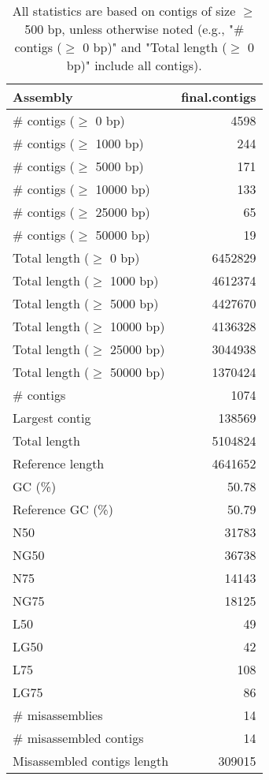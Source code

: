 \documentclass[12pt,a4paper]{article}
\begin{document}
\begin{table}[ht]
\begin{center}
\caption{All statistics are based on contigs of size $\geq$ 500 bp, unless otherwise noted (e.g., "\# contigs ($\geq$ 0 bp)" and "Total length ($\geq$ 0 bp)" include all contigs).}
\begin{tabular}{|l*{1}{|r}|}
\hline
Assembly & final.contigs \\ \hline
\# contigs ($\geq$ 0 bp) & 4598 \\ \hline
\# contigs ($\geq$ 1000 bp) & 244 \\ \hline
\# contigs ($\geq$ 5000 bp) & 171 \\ \hline
\# contigs ($\geq$ 10000 bp) & 133 \\ \hline
\# contigs ($\geq$ 25000 bp) & 65 \\ \hline
\# contigs ($\geq$ 50000 bp) & 19 \\ \hline
Total length ($\geq$ 0 bp) & 6452829 \\ \hline
Total length ($\geq$ 1000 bp) & 4612374 \\ \hline
Total length ($\geq$ 5000 bp) & 4427670 \\ \hline
Total length ($\geq$ 10000 bp) & 4136328 \\ \hline
Total length ($\geq$ 25000 bp) & 3044938 \\ \hline
Total length ($\geq$ 50000 bp) & 1370424 \\ \hline
\# contigs & 1074 \\ \hline
Largest contig & 138569 \\ \hline
Total length & 5104824 \\ \hline
Reference length & 4641652 \\ \hline
GC (\%) & 50.78 \\ \hline
Reference GC (\%) & 50.79 \\ \hline
N50 & 31783 \\ \hline
NG50 & 36738 \\ \hline
N75 & 14143 \\ \hline
NG75 & 18125 \\ \hline
L50 & 49 \\ \hline
LG50 & 42 \\ \hline
L75 & 108 \\ \hline
LG75 & 86 \\ \hline
\# misassemblies & 14 \\ \hline
\# misassembled contigs & 14 \\ \hline
Misassembled contigs length & 309015 \\ \hline

\end{tabular}
\end{center}
\end{table}
\end{document}

